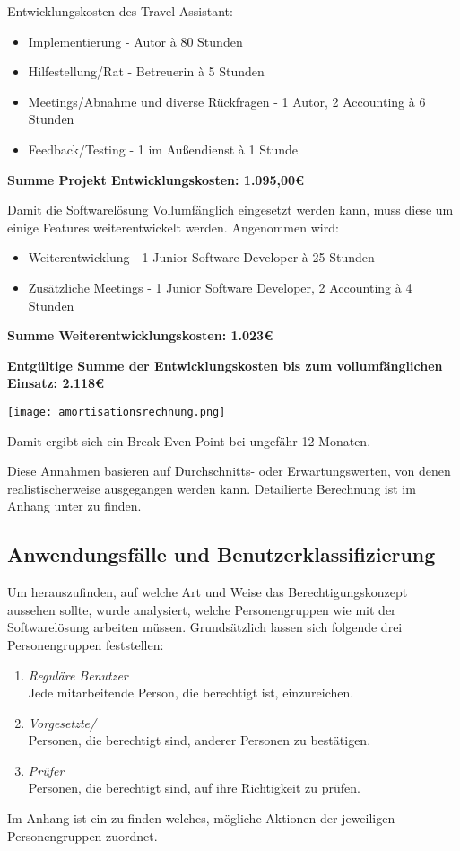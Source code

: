 Entwicklungskosten des Travel-Assistant:
\begin{itemize}

\item Implementierung - Autor à 80 Stunden
\item Hilfestellung/Rat - Betreuerin à 5 Stunden 
\item Meetings/Abnahme und diverse Rückfragen - 1 Autor, 2  Accounting à 6 Stunden
\item Feedback/Testing - 1  im Außendienst à 1 Stunde
\end{itemize}

\textbf{Summe Projekt Entwicklungskosten: 1.095,00€}

Damit die Softwarelösung Vollumfänglich eingesetzt werden kann, muss diese um einige Features weiterentwickelt werden. Angenommen wird:
\begin{itemize}
\item Weiterentwicklung - 1 Junior Software Developer à 25 Stunden
\item Zusätzliche Meetings - 1 Junior Software Developer, 2  Accounting à 4 Stunden
\end{itemize}

\textbf{Summe Weiterentwicklungskosten: 1.023€}

\textbf{Entgültige Summe der Entwicklungskosten bis zum vollumfänglichen Einsatz: 2.118€}

\texttt{[image: amortisationsrechnung.png]}

Damit ergibt sich ein Break Even Point bei ungefähr 12 Monaten.

Diese Annahmen basieren auf Durchschnitts- oder Erwartungswerten, von denen realistischerweise ausgegangen werden kann.
Detailierte Berechnung ist im Anhang unter  zu finden.

\subsection{Anwendungsfälle und Benutzerklassifizierung}
\label{sec:Analysephase:Benutzerklassifizierung}

Um herauszufinden, auf welche Art und Weise das Berechtigungskonzept aussehen sollte, wurde analysiert, welche Personengruppen wie mit der Softwarelösung arbeiten müssen.
Grundsätzlich lassen sich folgende drei Personengruppen feststellen:

\begin{enumerate}
    \item \emph{Reguläre Benutzer}\\
    Jede mitarbeitende Person, die berechtigt ist,  einzureichen.
    \item \emph{Vorgesetzte/}\\
    Personen, die berechtigt sind,  anderer Personen zu bestätigen.
    \item \emph{Prüfer}\\
    Personen, die berechtigt sind,  auf ihre Richtigkeit zu prüfen.
\end{enumerate}

Im Anhang ist ein  zu finden welches, mögliche Aktionen der jeweiligen Personengruppen zuordnet.